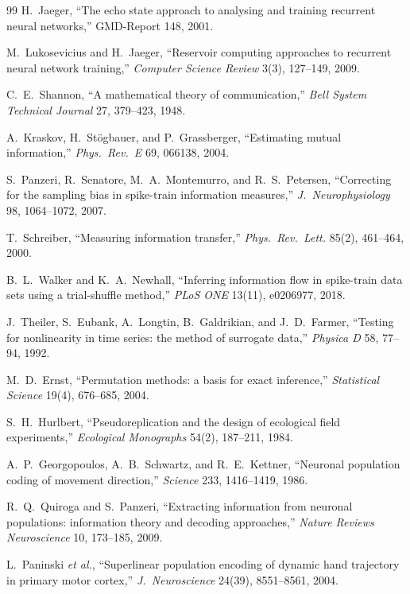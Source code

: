 \documentclass[10pt,a4paper]{article}
\begin{document}
\begin{thebibliography}{99}
H.~Jaeger, ``The echo state approach to analysing and training
recurrent neural networks,'' GMD-Report 148, 2001.

M.~Lukosevicius and H.~Jaeger, ``Reservoir computing approaches to
recurrent neural network training,'' \emph{Computer Science Review}
3(3), 127--149, 2009.

C.~E.~Shannon, ``A mathematical theory of communication,''
\emph{Bell System Technical Journal} 27, 379--423, 1948.

A.~Kraskov, H.~St{\"o}gbauer, and P.~Grassberger, ``Estimating
mutual information,'' \emph{Phys.\ Rev.\ E} 69, 066138, 2004.

S.~Panzeri, R.~Senatore, M.~A.~Montemurro, and R.~S.~Petersen,
``Correcting for the sampling bias in spike-train information
measures,'' \emph{J.\ Neurophysiology} 98, 1064--1072, 2007.

T.~Schreiber, ``Measuring information transfer,''
\emph{Phys.\ Rev.\ Lett.} 85(2), 461--464, 2000.

B.~L.~Walker and K.~A.~Newhall, ``Inferring information flow in
spike-train data sets using a trial-shuffle method,'' \emph{PLoS
ONE} 13(11), e0206977, 2018.

J.~Theiler, S.~Eubank, A.~Longtin, B.~Galdrikian, and J.~D.~Farmer,
``Testing for nonlinearity in time series: the method of surrogate
data,'' \emph{Physica D} 58, 77--94, 1992.

M.~D.~Ernst, ``Permutation methods: a basis for exact inference,''
\emph{Statistical Science} 19(4), 676--685, 2004.

S.~H.~Hurlbert, ``Pseudoreplication and the design of ecological
field experiments,'' \emph{Ecological Monographs} 54(2), 187--211,
1984.

A.~P.~Georgopoulos, A.~B.~Schwartz, and R.~E.~Kettner, ``Neuronal
population coding of movement direction,'' \emph{Science} 233,
1416--1419, 1986.

R.~Q.~Quiroga and S.~Panzeri, ``Extracting information from
neuronal populations: information theory and decoding approaches,''
\emph{Nature Reviews Neuroscience} 10, 173--185, 2009.

L.~Paninski \emph{et al.}, ``Superlinear population encoding of
dynamic hand trajectory in primary motor cortex,''
\emph{J.\ Neuroscience} 24(39), 8551--8561, 2004.


\end{thebibliography}
\end{document}

